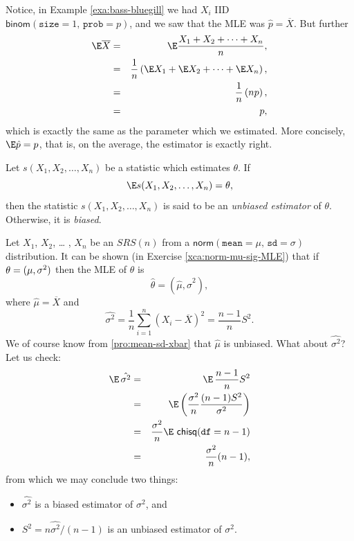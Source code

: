 \documentclass[captions=tableheading]{scrbook}
\begin{document}
Notice, in Example \ref{exa:bass-bluegill} we had \(X_{i}\) IID \(\mathsf{binom}(\mathtt{size}=1,\,\mathtt{prob}=p)\), and we saw that the MLE was \(\hat{p}=\overline{X}\). But further
\begin{eqnarray*}
\E\overline{X} & = & \E\frac{X_{1}+X_{2}+\cdots+X_{n}}{n},\\
 & = & \frac{1}{n}\left(\E X_{1}+\E X_{2}+\cdots+\E X_{n}\right),\\
 & = & \frac{1}{n}\left(np\right),\\
 & = & p,
\end{eqnarray*}
which is exactly the same as the parameter which we estimated. More concisely, \(\E\hat{p}=p\), that is, on the average, the estimator is exactly right.

\begin{defn}
Let \(s(X_{1},X_{2},\ldots,X_{n})\) be a statistic which estimates \(\theta\). If 
\[
\E s(X_{1},X_{2},\ldots,X_{n})=\theta,
\]
then the statistic \(s(X_{1},X_{2},\ldots,X_{n})\) is said to be an \emph{unbiased estimator} of \(\theta\). Otherwise, it is \emph{biased}.
\end{defn}

\begin{example}
\label{exa:normal-MLE-both}

Let \(X_{1}\), \(X_{2}\), \ldots{} , \(X_{n}\) be an \(SRS(n)\) from a \(\mathsf{norm}(\mathtt{mean}=\mu,\,\mathtt{sd}=\sigma)\) distribution. It can be shown (in Exercise \ref{xca:norm-mu-sig-MLE}) that if \(\mbox{\ensuremath{\theta}}=(\mu,\sigma^{2})\) then the MLE of \(\theta\) is
\begin{equation}
\hat{\theta}=(\hat{\mu},\hat{\sigma}^{2}),
\end{equation}
where \(\hat{\mu}=\overline{X}\) and
\begin{equation}
\hat{\sigma^{2}}=\frac{1}{n}\sum_{i=1}^{n}\left(X_{i}-\overline{X}\right)^{2}=\frac{n-1}{n}S^{2}.
\end{equation}
We of course know from \ref{pro:mean-sd-xbar} that \(\hat{\mu}\) is unbiased. What about \(\hat{\sigma^{2}}\)? Let us check: 
\begin{eqnarray*}
\E\,\hat{\sigma^{2}} & = & \E\,\frac{n-1}{n}S^{2}\\
 & = & \E\left(\frac{\sigma^{2}}{n}\frac{(n-1)S^{2}}{\sigma^{2}}\right)\\
 & = & \frac{\sigma^{2}}{n}\E\ \mathsf{chisq}(\mathtt{df}=n-1)\\
 & = & \frac{\sigma^{2}}{n}(n-1),
\end{eqnarray*}
from which we may conclude two things:
\begin{itemize}
\item \(\hat{\sigma^{2}}\) is a biased estimator of \(\sigma^{2}\), and
\item \(S^{2}=n\hat{\sigma^{2}}/(n-1)\) is an unbiased estimator of \(\sigma^{2}\).
\end{itemize}

\end{example}
\end{document}
